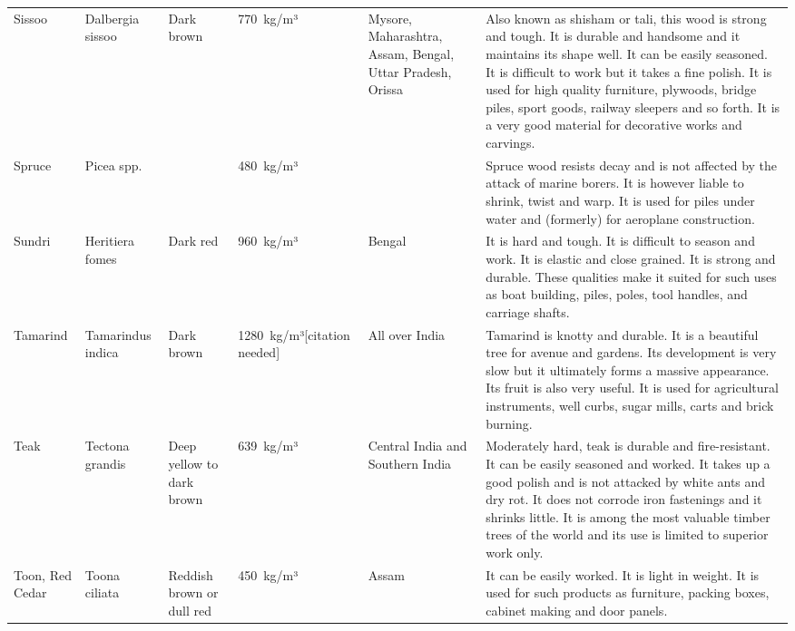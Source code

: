 \documentclass{article}
\begin{document}
\begin{tabular}{llllll}
Sissoo & Dalbergia sissoo & Dark brown & 770 kg/m³ & Mysore, Maharashtra, Assam, Bengal, Uttar Pradesh, Orissa & Also known as shisham or tali, this wood is strong and tough. It is durable and handsome and it maintains its shape well. It can be easily seasoned. It is difficult to work but it takes a fine polish. It is used for high quality furniture, plywoods, bridge piles, sport goods, railway sleepers and so forth. It is a very good material for decorative works and carvings. \\
Spruce & Picea spp. &  & 480 kg/m³ &  & Spruce wood resists decay and is not affected by the attack of marine borers. It is however liable to shrink, twist and warp. It is used for piles under water and (formerly) for aeroplane construction. \\
Sundri & Heritiera fomes & Dark red & 960 kg/m³ & Bengal & It is hard and tough. It is difficult to season and work. It is elastic and close grained. It is strong and durable. These qualities make it suited for such uses as boat building, piles, poles, tool handles, and carriage shafts. \\
Tamarind & Tamarindus indica & Dark brown & 1280 kg/m³[citation needed] & All over India & Tamarind is knotty and durable. It is a beautiful tree for avenue and gardens. Its development is very slow but it ultimately forms a massive appearance. Its fruit is also very useful. It is used for agricultural instruments, well curbs, sugar mills, carts and brick burning. \\
Teak & Tectona grandis & Deep yellow to dark brown & 639 kg/m³ & Central India and Southern India & Moderately hard, teak is durable and fire-resistant. It can be easily seasoned and worked. It takes up a good polish and is not attacked by white ants and dry rot. It does not corrode iron fastenings and it shrinks little. It is among the most valuable timber trees of the world and its use is limited to superior work only. \\
Toon, Red Cedar & Toona ciliata & Reddish brown or dull red & 450 kg/m³ & Assam & It can be easily worked. It is light in weight. It is used for such products as furniture, packing boxes, cabinet making and door panels. \\
\bottomrule
\end{tabular}
\end{document}
